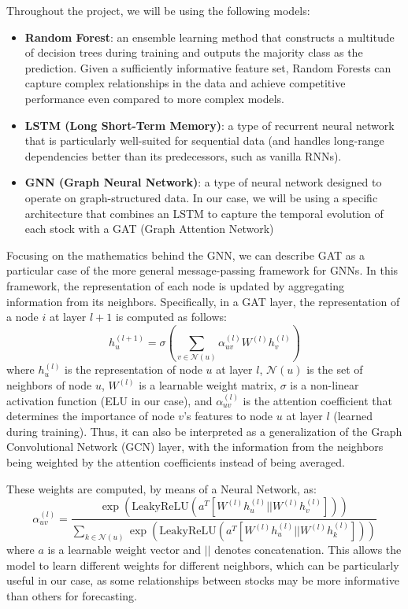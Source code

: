\documentclass{article}
\begin{document}
Throughout the project, we will be using the following models:
\begin{itemize}
    \item \textbf{Random Forest}: an ensemble learning method that constructs a multitude of decision trees during training and outputs the majority class as the prediction. Given a sufficiently informative feature set, Random Forests can capture complex relationships in the data and achieve competitive performance even compared to more complex models.
    \item \textbf{LSTM (Long Short-Term Memory)}: a type of recurrent neural network that is particularly well-suited for sequential data (and handles long-range dependencies better than its predecessors, such as vanilla RNNs).
    \item \textbf{GNN (Graph Neural Network)}: a type of neural network designed to operate on graph-structured data. In our case, we will be using a specific architecture that combines an LSTM to capture the temporal evolution of each stock with a GAT (Graph Attention Network)
\end{itemize}

Focusing on the mathematics behind the GNN, we can describe GAT as a particular case of the more general message-passing framework for GNNs. In this framework, the representation of each node is updated by aggregating information from its neighbors. Specifically, in a GAT layer, the representation of a node $i$ at layer $l+1$ is computed as follows:
\begin{equation}
    h_u^{(l+1)} = \sigma\left(\sum_{v \in \mathcal{N}(u)} \alpha_{uv}^{(l)} W^{(l)} h_v^{(l)}\right)
\end{equation}
where $h_u^{(l)}$ is the representation of node $u$ at layer $l$, $\mathcal{N}(u)$ is the set of neighbors of node $u$, $W^{(l)}$ is a learnable weight matrix, $\sigma$ is a non-linear activation function (ELU in our case), and $\alpha_{uv}^{(l)}$ is the attention coefficient that determines the importance of node $v$'s features to node $u$ at layer $l$ (learned during training). Thus, it can also be interpreted as a generalization of the Graph Convolutional Network (GCN) layer, with the information from the neighbors being weighted by the attention coefficients instead of being averaged.

These weights are computed, by means of a Neural Network, as:
\begin{equation}
    \alpha_{uv}^{(l)} = \frac{\exp\left(\text{LeakyReLU}\left(a^T [W^{(l)} h_u^{(l)} || W^{(l)} h_v^{(l)}]\right)\right)}{\sum_{k \in \mathcal{N}(u)} \exp\left(\text{LeakyReLU}\left(a^T [W^{(l)} h_u^{(l)} || W^{(l)} h_k^{(l)}]\right)\right)}
\end{equation}
where $a$ is a learnable weight vector and $||$ denotes concatenation. This allows the model to learn different weights for different neighbors, which can be particularly useful in our case, as some relationships between stocks may be more informative than others for forecasting.
\end{document}

